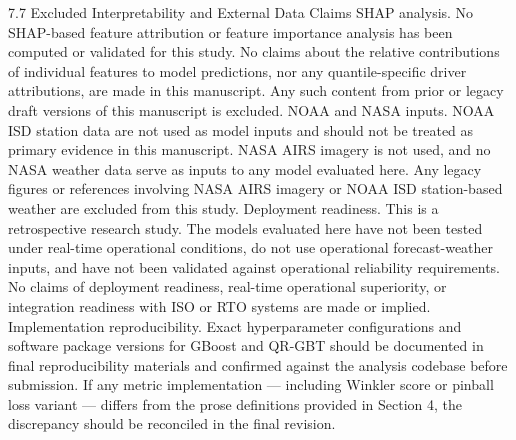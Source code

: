7.7 Excluded Interpretability and External Data Claims
SHAP analysis. No SHAP-based feature attribution or feature importance analysis has been computed or validated for this study. No claims about the relative contributions of individual features to model predictions, nor any quantile-specific driver attributions, are made in this manuscript. Any such content from prior or legacy draft versions of this manuscript is excluded.
NOAA and NASA inputs. NOAA ISD station data are not used as model inputs and should not be treated as primary evidence in this manuscript. NASA AIRS imagery is not used, and no NASA weather data serve as inputs to any model evaluated here. Any legacy figures or references involving NASA AIRS imagery or NOAA ISD station-based weather are excluded from this study.
Deployment readiness. This is a retrospective research study. The models evaluated here have not been tested under real-time operational conditions, do not use operational forecast-weather inputs, and have not been validated against operational reliability requirements. No claims of deployment readiness, real-time operational superiority, or integration readiness with ISO or RTO systems are made or implied.
Implementation reproducibility. Exact hyperparameter configurations and software package versions for GBoost and QR-GBT should be documented in final reproducibility materials and confirmed against the analysis codebase before submission. If any metric implementation — including Winkler score or pinball loss variant — differs from the prose definitions provided in Section 4, the discrepancy should be reconciled in the final revision.